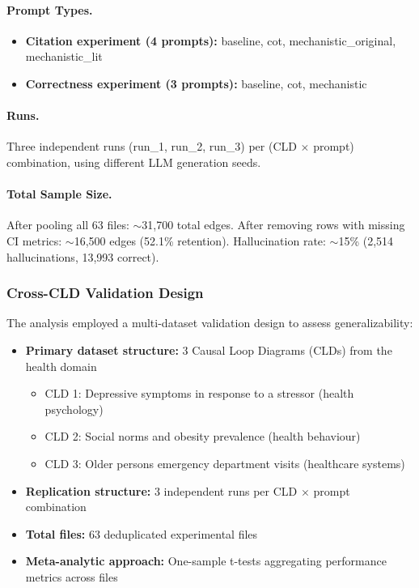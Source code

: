 \paragraph{Prompt Types.}
\begin{itemize}
    \item \textbf{Citation experiment (4 prompts):} baseline, cot, mechanistic\_original, mechanistic\_lit
    \item \textbf{Correctness experiment (3 prompts):} baseline, cot, mechanistic
\end{itemize}

\paragraph{Runs.} Three independent runs (run\_1, run\_2, run\_3) per (CLD $\times$ prompt) combination, using different LLM generation seeds.

\paragraph{Total Sample Size.} After pooling all 63 files: $\sim$31,700 total edges. After removing rows with missing CI metrics: $\sim$16,500 edges (52.1\% retention). Hallucination rate: $\sim$15\% (2,514 hallucinations, 13,993 correct).

\subsubsection{Cross-CLD Validation Design}

The analysis employed a multi-dataset validation design to assess generalizability:

\begin{itemize}
    \item \textbf{Primary dataset structure:} 3 Causal Loop Diagrams (CLDs) from the health domain
    \begin{itemize}
        \item CLD 1: Depressive symptoms in response to a stressor (health psychology)
        \item CLD 2: Social norms and obesity prevalence (health behaviour)
        \item CLD 3: Older persons emergency department visits (healthcare systems)
    \end{itemize}
    \item \textbf{Replication structure:} 3 independent runs per CLD $\times$ prompt combination
    \item \textbf{Total files:} 63 deduplicated experimental files
    \item \textbf{Meta-analytic approach:} One-sample t-tests aggregating performance metrics across files
\end{itemize}

